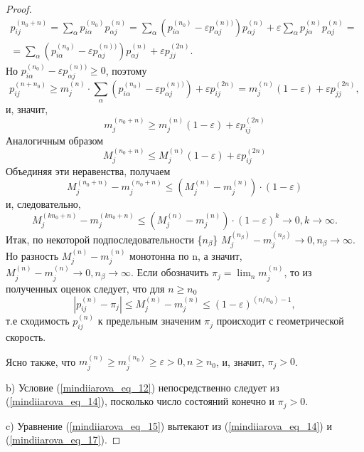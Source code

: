 \begin{proof}
\begin{multline} \label{mindiiarova_eq_20} 
     p_{i j}^{(n_0+n)} = \sum\limits_{\alpha}p_{i \alpha}^{(n_0)}p_{\alpha j}^{(n)} =\sum\limits_{\alpha}(p_{i \alpha}^{(n_0)} - \varepsilon p_{\alpha j}^{(n))})p_{\alpha j}^{(n)} +\varepsilon\sum\limits_{\alpha}p_{j \alpha}^{(n)}p_{\alpha j}^{(n)} = \
     \\
   = \sum\limits_{\alpha}(p_{i \alpha}^{(n_0)} - \varepsilon p_{\alpha j}^{(n))})p_{\alpha j}^{(n)} + \varepsilon p^{(2n)}_{j j}.
\end{multline}
Но $p_{i \alpha}^{(n_0)} - \varepsilon p_{\alpha j}^{(n))} \geq 0$, поэтому 
\begin{equation} \label{mindiiarova_eq_21} 
     p_{ij}^{(n+n_0)} \geq m_j^{(n)} \cdot \sum\limits_{\alpha}(p_{i \alpha}^{(n_0)} - \varepsilon p_{\alpha j}^{(n))}) + \varepsilon p^{(2n)}_{i j} = m_j^{(n)}(1-\varepsilon)+\varepsilon p^{(2n)}_{j j},
\end{equation}
и, значит, 
\begin{equation} \label{mindiiarova_eq_22} 
     m_j^{(n_0+n)} \geq m_j^{(n)}(1-\varepsilon)+\varepsilon p^{(2n)}_{i j}
\end{equation}
Аналогичным образом
\begin{equation} \label{mindiiarova_eq_23} 
     M_j^{(n_0+n)} \leq M_j^{(n)}(1-\varepsilon)+\varepsilon p^{(2n)}_{i j}
\end{equation}
Объединяя эти неравенства, получаем
\begin{equation} \label{mindiiarova_eq_24} 
     M_j^{(n_0+n)} - m_j^{(n_0+n)} \leq (M_j^{(n)} - m_j^{(n)}) \cdot(1-\varepsilon)
\end{equation}
и, следовательно,
\begin{equation}\label{mindiiarova_eq_25} 
     M_j^{(kn_0+n)} - m_j^{(kn_0+n)} \leq (M_j^{(n)} - m_j^{(n)}) \cdot(1-\varepsilon)^k \rightarrow  0, k  \rightarrow \infty.
\end{equation}
Итак, по некоторой подпоследовательности \{$n_\beta$\} $M_j^{(n_\beta)} - m_j^{(n_\beta)}  \rightarrow 0, n_\beta \rightarrow \infty$. Но разность $M_j^{(n)} - m_j^{(n)}$ монотонна по n, а значит, $M_j^{(n)} - m_j^{(n)}  \rightarrow 0, n_\beta \rightarrow \infty$.
Если обозначить $\pi_j = \lim_{n} m_j^{(n)}$, то из полученных оценок следует, что для  $n \geq n_0$
\begin{equation} \label{mindiiarova_eq_26} 
     |p_{i j}^{(n)} - \pi_j| \leq M_j^{(n)} - m_j^{(n)} \leq (1-\varepsilon)^{(n/n_0) - 1},
\end{equation}
т.е сходимость $p_{i j}^{(n)}$ к предельным значеним $\pi_j$ происходит с геометрической скорость.

Ясно также, что $m_j^{(n)} \geq  m_j^{(n_0)} \geq \varepsilon > 0, n \geq n_0$, и, значит, $\pi_j >0$.


b) Условие (\ref{mindiiarova_eq_12}) непосредственно следует из (\ref{mindiiarova_eq_14}), посколько число состояний конечно и $\pi_j >0$.


c) Уравнение (\ref{mindiiarova_eq_15}) вытекают из (\ref{mindiiarova_eq_14}) и (\ref{mindiiarova_eq_17}).

\end{proof}


